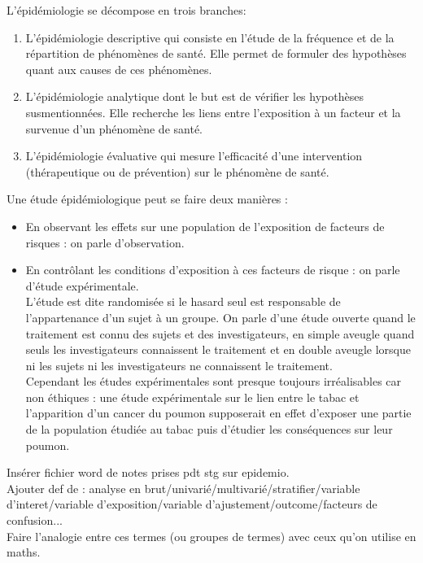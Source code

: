 \documentclass{book}
\begin{document}
L'épidémiologie se décompose en trois branches:
\begin{enumerate}
\item L'épidémiologie descriptive qui consiste en l'étude de la fréquence et de la répartition de phénomènes de santé.  Elle permet de formuler des hypothèses quant aux causes de ces phénomènes.
\item L'épidémiologie analytique dont le but est de vérifier les hypothèses susmentionnées. Elle recherche les liens entre l'exposition à un facteur et la survenue d'un phénomène de santé.
\item L'épidémiologie évaluative qui mesure l'efficacité d'une intervention (thérapeutique ou de prévention) sur le phénomène de santé.
\end{enumerate}

Une étude épidémiologique peut se faire deux manières :
\begin{itemize}
\item En observant les effets sur une population de l'exposition de facteurs de risques : on parle d'observation.
\item En contrôlant les conditions d'exposition à ces facteurs de risque : on parle d'étude expérimentale.\\
L'étude est dite randomisée si le hasard seul est responsable de l'appartenance d'un sujet à un groupe. On parle d'une étude ouverte quand le traitement est connu des sujets et des investigateurs, en simple aveugle quand seuls les investigateurs connaissent le traitement et en double aveugle lorsque ni les sujets ni les investigateurs ne connaissent le traitement.\\
Cependant les études expérimentales sont presque toujours irréalisables car non éthiques : une étude expérimentale sur le lien entre le tabac et l'apparition d'un cancer du poumon supposerait en effet d'exposer une partie de la population étudiée au tabac puis d'étudier les conséquences sur leur poumon.\\

\end{itemize}




Insérer fichier word de notes prises pdt stg sur epidemio.\\
Ajouter def de :
analyse en brut/univarié/multivarié/stratifier/variable d'interet/variable d'exposition/variable d'ajustement/outcome/facteurs de confusion...\\
Faire l'analogie entre ces termes (ou groupes de termes) avec ceux qu'on utilise en maths. 
\end{document}
